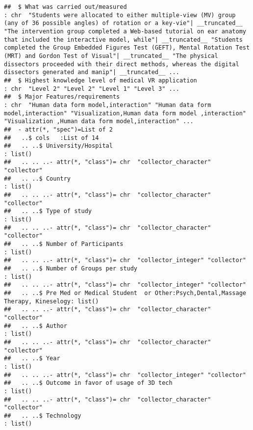 \documentclass[]{article}
\begin{document}
\begin{verbatim}
##  $ What was carried out/measured                                                : chr  "Students were allocated to either multiple-view (MV) group (any of 36 possible angles) of rotation or a key-vie"| __truncated__ "The intervention group completed a Web-based tutorial on ear anatomy that included the interactive model, while"| __truncated__ "Students completed the Group Embedded Figures Test (GEFT), Mental Rotation Test (MRT) and Gordon Test of Visual"| __truncated__ "The physical dissectors proceeded with their direct methods, whereas the digital dissectors generated and manip"| __truncated__ ...
##  $ Highest knowledge level of medical VR application                            : chr  "Level 2" "Level 2" "Level 1" "Level 3" ...
##  $ Major Features/requirements                                                  : chr  "Human data form model,interaction" "Human data form model,interaction" "Visualization,Human data form model ,interaction" "Visualization ,Human data form model,interaction" ...
##  - attr(*, "spec")=List of 2
##   ..$ cols   :List of 14
##   .. ..$ University/Hospital                                                          : list()
##   .. .. ..- attr(*, "class")= chr  "collector_character" "collector"
##   .. ..$ Country                                                                      : list()
##   .. .. ..- attr(*, "class")= chr  "collector_character" "collector"
##   .. ..$ Type of study                                                                : list()
##   .. .. ..- attr(*, "class")= chr  "collector_character" "collector"
##   .. ..$ Number of Participants                                                       : list()
##   .. .. ..- attr(*, "class")= chr  "collector_integer" "collector"
##   .. ..$ Number of Groups per study                                                   : list()
##   .. .. ..- attr(*, "class")= chr  "collector_integer" "collector"
##   .. ..$ Pre Med or Medical Student  or Other:Psych,Dental,Massage Therapy, Kineselogy: list()
##   .. .. ..- attr(*, "class")= chr  "collector_character" "collector"
##   .. ..$ Author                                                                       : list()
##   .. .. ..- attr(*, "class")= chr  "collector_character" "collector"
##   .. ..$ Year                                                                         : list()
##   .. .. ..- attr(*, "class")= chr  "collector_integer" "collector"
##   .. ..$ Outcome in favor of usage of 3D tech                                         : list()
##   .. .. ..- attr(*, "class")= chr  "collector_character" "collector"
##   .. ..$ Technology                                                                   : list()

\end{verbatim}
\end{document}
